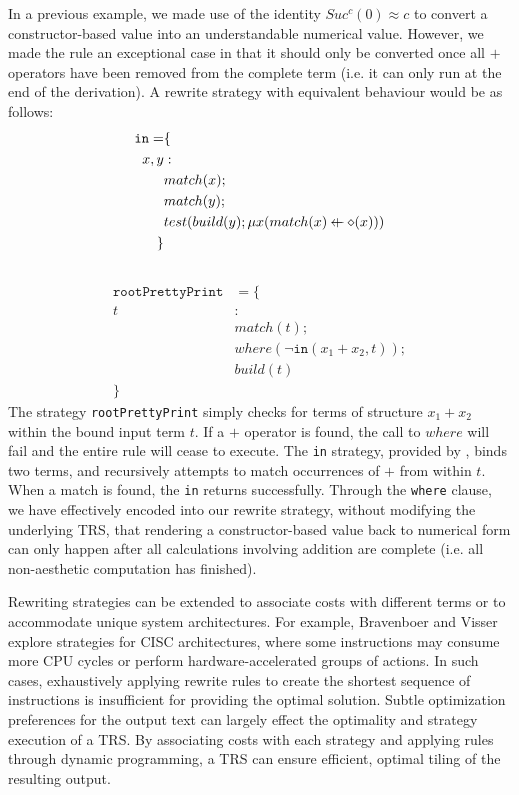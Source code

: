 \documentclass{article}
\makeatletter
\newcommand{\superimpose}[2]{{%
  \ooalign{%
    \hfil$\m@th#1\@firstoftwo#2$\hfil\cr
    \hfil$\m@th#1\@secondoftwo#2$\hfil\cr
  }%
}}
\newcommand{\leftplus}{\mathbin{\mathpalette\superimpose{{\leftarrow}{+}}}}
\makeatother
\begin{document}
In a previous example, we made use of the identity $Suc^c(0) \approx c$ to convert a constructor-based value into an understandable numerical value.
However, we made the rule an exceptional case in that it should only be converted once all $+$ operators have been removed from the complete term
(i.e. it can only run at the end of the derivation). A rewrite strategy with equivalent behaviour would be as follows:
\begin{align*}
    \texttt{in} = &\{\\
        x,y&:\\
        &match(x);\\
        &match(y);\\
        &test(build(y);\mu x(match(x) \leftplus \diamond(x)))\\
        \}\\\\
\end{align*}
\begin{align*}
\texttt{rootPrettyPrint} &= \{\\
        t&:\\
        &match(t);\\
        &where(\lnot \texttt{in}(x_1+x_2, t));\\
        &build(t)\\
        \}
\end{align*}
The strategy \texttt{rootPrettyPrint} simply checks for terms of structure $x_1+x_2$ within the bound input term $t$. If a $+$ operator is found,
the call to $where$ will fail and the entire rule will cease to execute. The \texttt{in} strategy, provided by \cite{elco1998building},
binds two terms, and recursively attempts to match occurrences of $+$ from within $t$. When a match is found, the \texttt{in} returns successfully.
Through the \texttt{where} clause, we have effectively encoded into our rewrite strategy, without modifying the underlying TRS,
that rendering a constructor-based value back to numerical form
can only happen after all calculations involving addition are complete (i.e. all non-aesthetic computation has finished).

Rewriting strategies can be extended to associate costs with different terms or to accommodate unique system architectures. For example, Bravenboer and Visser \cite{bravenboer2002Rewriting} explore strategies for CISC architectures, where some instructions may consume more CPU cycles or perform hardware-accelerated groups of actions. In such cases, exhaustively applying rewrite rules to create the shortest sequence of instructions is insufficient for providing the optimal solution. Subtle optimization preferences for the output text can largely effect the optimality and strategy execution of a TRS. By associating costs with each strategy and applying rules through dynamic programming, a TRS can ensure efficient, optimal tiling of the resulting output.
\end{document}
